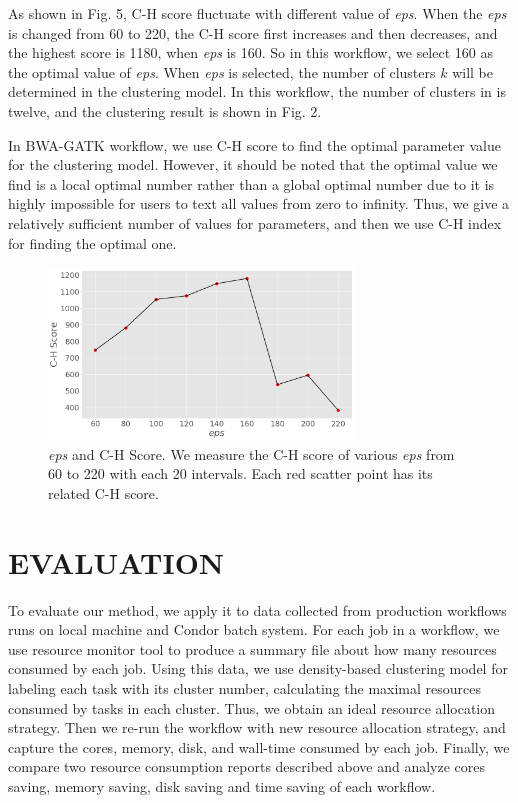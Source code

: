\documentclass[conference]{IEEEtran}
\begin{document}
As shown in Fig. 5, C-H score fluctuate with different value of \emph{eps}. When the \emph{eps} is changed from 60 to 220, the C-H score first increases and then decreases, and the highest score is 1180, when \emph{eps} is 160. So in this workflow, we select 160 as the optimal value of \emph{eps}. When \emph{eps} is selected, the number of clusters $k$ will be determined in the clustering model. In this workflow, the number of clusters in is twelve, and the clustering result is shown in Fig. 2.

In BWA-GATK workflow, we use C-H score to find the optimal parameter value for the clustering model. However, it should be noted that the optimal value we find is a local optimal number rather than a global optimal number due to it is highly impossible for users to text all values from zero to infinity. Thus, we give a relatively sufficient number of values for parameters, and then we use C-H index for finding the optimal one.

\begin{figure}[htbp]
\centering
\includegraphics[width=3.2in]{./epsandscore.png} 
\caption{\emph{eps} and C-H Score. We measure the C-H score of various \emph{eps} from 60 to 220 with each 20 intervals. Each red scatter point has its related C-H score.}
\end{figure}


\section{EVALUATION}
To evaluate our method, we apply it to data collected from production workflows runs on local machine and Condor batch system. For each job in a workflow, we use resource monitor tool to produce a summary file about how many resources consumed by each job. Using this data, we use density-based clustering model for labeling each task with its cluster number, calculating the maximal resources consumed by tasks in each cluster. Thus, we obtain an ideal resource allocation strategy. Then we re-run the workflow with new resource allocation strategy, and capture the cores, memory, disk, and wall-time consumed by each job. Finally, we compare two resource consumption reports described above and analyze cores saving, memory saving, disk saving and time saving of each workflow.
\end{document}
